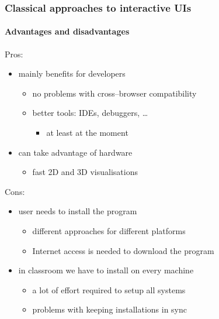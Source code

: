 \documentclass{beamer}
\begin{document}
\begin{frame}
    \frametitle{Classical approaches to interactive UIs}
    \framesubtitle{Advantages and disadvantages}

    {\color{MyGreen} Pros}:
    \begin{itemize}
        \item mainly benefits for developers
            \begin{itemize}
                \pause
                \item no problems with cross--browser compatibility
                \pause
                \item better tools: IDEs, debuggers, \ldots
                    \begin{itemize}
                        \pause
                        \item at least at the moment
                    \end{itemize}
            \end{itemize}
        \pause
        \item can take advantage of hardware
            \begin{itemize}
                \pause
                \item fast 2D and 3D visualisations
            \end{itemize}
    \end{itemize}
    \pause
    {\color{red} Cons}:
    \begin{itemize}
        \pause
        \item user needs to install the program
            \begin{itemize}
                \item different approaches for different platforms
                \item Internet access is needed to download the program
            \end{itemize}
        \pause
        \item in classroom we have to install on every machine
            \begin{itemize}
                \item a lot of effort required to setup all systems
                \item problems with keeping installations in sync
            \end{itemize}
    \end{itemize}
\end{frame}
\end{document}
